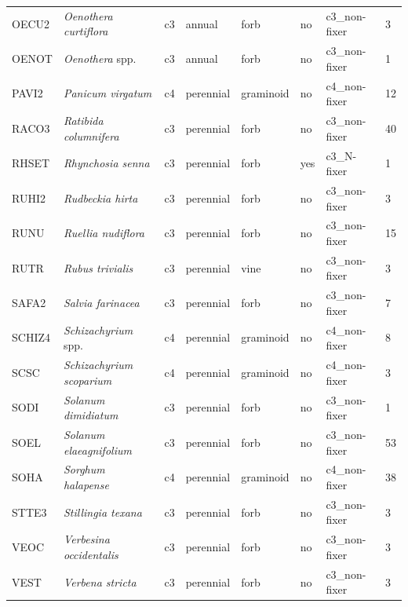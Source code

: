 \begin{landscape}
\begin{table}[]
{\begin{tabular}{p{2cm}p{5cm}p{2cm}p{2cm}p{2cm}p{2cm}p{3.5cm}p{2cm}}
        OECU2  & \textit{Oenothera curtiflora}      & c3 & annual    & forb           & no  & c3\_non-fixer & 3  \\
        OENOT  & \textit{Oenothera} spp.            & c3 & annual    & forb           & no  & c3\_non-fixer & 1  \\
        PAVI2  & \textit{Panicum virgatum}          & c4 & perennial & graminoid      & no  & c4\_non-fixer & 12 \\
        RACO3  & \textit{Ratibida columnifera}      & c3 & perennial & forb           & no  & c3\_non-fixer & 40 \\
        RHSET  & \textit{Rhynchosia senna}          & c3 & perennial & forb           & yes & c3\_N-fixer    & 1  \\
        RUHI2  & \textit{Rudbeckia hirta}           & c3 & perennial & forb           & no  & c3\_non-fixer & 3  \\
        RUNU   & \textit{Ruellia nudiflora}         & c3 & perennial & forb           & no  & c3\_non-fixer & 15 \\
        RUTR   & \textit{Rubus trivialis}           & c3 & perennial & vine           & no  & c3\_non-fixer & 3  \\
        SAFA2  & \textit{Salvia farinacea}          & c3 & perennial & forb           & no  & c3\_non-fixer & 7  \\
        SCHIZ4 & \textit{Schizachyrium} spp.        & c4 & perennial & graminoid      & no  & c4\_non-fixer & 8  \\
        SCSC   & \textit{Schizachyrium scoparium}   & c4 & perennial & graminoid      & no  & c4\_non-fixer & 3  \\
        SODI   & \textit{Solanum dimidiatum}        & c3 & perennial & forb           & no  & c3\_non-fixer & 1  \\
        SOEL   & \textit{Solanum elaeagnifolium}    & c3 & perennial & forb           & no  & c3\_non-fixer & 53 \\
        SOHA   & \textit{Sorghum halapense}         & c4 & perennial & graminoid      & no  & c4\_non-fixer & 38 \\
        STTE3  & \textit{Stillingia texana}         & c3 & perennial & forb           & no  & c3\_non-fixer & 3  \\
        VEOC   & \textit{Verbesina occidentalis}    & c3 & perennial & forb           & no  & c3\_non-fixer & 3  \\
        VEST   & \textit{Verbena stricta}           & c3 & perennial & forb           & no  & c3\_non-fixer & 3  \\
        \hline
    \end{tabular}}
\end{table}
\end{landscape}
\clearpage

